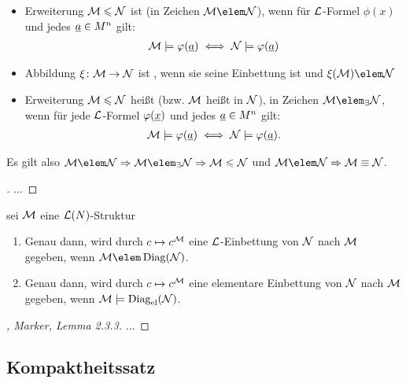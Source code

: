 \begin{definition}
	\begin{itemize}
		\item Erweiterung $\mathcal M \leqslant \mathcal N$ ist  (in Zeichen $\MM \elem \NN$), wenn für  $\mathcal L$-Formel $\phi(x)$ und jedes $\underline{a} \in M^n$ gilt:
		\begin{align*}
		\mathcal M \models \varphi(\underline{a}) \iff \mathcal N \models \varphi(\underline{a})
		\end{align*}
		\item Abbildung $\xi \colon \mathcal M \to \mathcal N$ ist , wenn sie seine Einbettung ist und $\xi(\MM) \elem \NN$
		\item Erweiterung $\mathcal M \leqslant \mathcal N$ heißt  (bzw. $\mathcal M$ heißt  in $\mathcal N$), in Zeichen $\MM \elem_{\exists} \NN$, wenn für jede  $\mathcal L$-Formel $\varphi(\underline{x})$ und jedes $\underline{a} \in M^n$ gilt:
		\begin{align*}
			\mathcal M \models \varphi(\underline{a}) \iff \mathcal N \models \varphi(\underline{a}).
		\end{align*}
	\end{itemize}
\end{definition}
\begin{remark}
	Es gilt also $\MM\elem \NN \implies \MM \elem_{\exists} \NN \implies \MM \le \NN$ und $\MM \elem \NN \implies \MM \equiv \NN$.
\end{remark}
\begin{proof}[]
	$\dots$
\end{proof}
\begin{remark}
	 sei $\mathcal M$ eine $\mathcal L(N)$-Struktur
	\begin{enumerate}
		\item Genau dann, wird durch $c \mapsto c^{\mathcal M}$ eine $\mathcal L$-Einbettung von $\mathcal N$ nach $\mathcal M$ gegeben, wenn $\MM \elem \Diag(\NN)$.
		\item Genau dann, wird durch $c \mapsto c^{\mathcal M}$ eine elementare Einbettung von $\mathcal N$ nach $\mathcal M$ gegeben, wenn $\mathcal M \models \operatorname{Diag}_{\operatorname{el}}(\mathcal N)$.
	\end{enumerate}
\end{remark}
\begin{proof}[, Marker, Lemma 2.3.3]
	$\dots$
\end{proof}
\subsection{Kompaktheitssatz}

